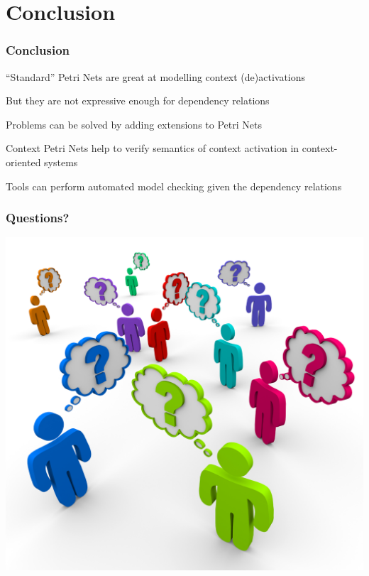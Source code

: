 \documentclass{beamer}
\newenvironment{wideitemize}{\itemize\addtolength{\itemsep}{10pt}}{\enditemize}
\begin{document}
\section{Conclusion}

\begin{frame}
	\frametitle{Conclusion}

	\begin{wideitemize}
		\item \enquote{Standard} Petri Nets are great at modelling context (de)activations
		\pause
		\item But they are not expressive enough for dependency relations
		\pause
		\item Problems can be solved by adding extensions to Petri Nets
		\pause
		\item Context Petri Nets help to verify semantics of context activation
		in context-oriented systems
		\pause
		\item Tools can perform automated model checking given the dependency
		relations
	\end{wideitemize}
\end{frame}

\begin{frame}
	\frametitle{Questions?}

	\begin{center}
		\includegraphics[height=0.8\paperheight]{questions.png}
	\end{center}
\end{frame}
\end{document}

